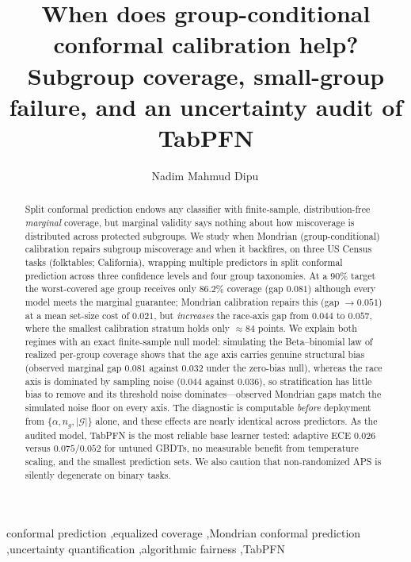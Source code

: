 \documentclass[review,12pt]{elsarticle}
\begin{document}
\begin{frontmatter}

\title{When does group-conditional conformal calibration help? Subgroup coverage, small-group failure, and an uncertainty audit of TabPFN}

\author[inst1]{Nadim Mahmud Dipu\,}

\begin{abstract}
Split conformal prediction endows any classifier with finite-sample, distribution-free \emph{marginal} coverage, but marginal validity says nothing about how miscoverage is distributed across protected subgroups. We study when Mondrian (group-conditional) calibration repairs subgroup miscoverage and when it backfires, on three US Census tasks (folktables; California), wrapping multiple predictors in split conformal prediction across three confidence levels and four group taxonomies. At a $90\%$ target the worst-covered age group receives only $86.2\%$ coverage (gap $0.081$) although every model meets the marginal guarantee; Mondrian calibration repairs this (gap $\to 0.051$) at a mean set-size cost of $0.021$, but \emph{increases} the race-axis gap from $0.044$ to $0.057$, where the smallest calibration stratum holds only $\approx\!84$ points. We explain both regimes with an exact finite-sample null model: simulating the Beta--binomial law of realized per-group coverage shows that the age axis carries genuine structural bias (observed marginal gap $0.081$ against $0.032$ under the zero-bias null), whereas the race axis is dominated by sampling noise ($0.044$ against $0.036$), so stratification has little bias to remove and its threshold noise dominates---observed Mondrian gaps match the simulated noise floor on every axis. The diagnostic is computable \emph{before} deployment from $\{\alpha, n_g, |\mathcal{G}|\}$ alone, and these effects are nearly identical across predictors. As the audited model, TabPFN is the most reliable base learner tested: adaptive ECE $0.026$ versus $0.075$/$0.052$ for untuned GBDTs, no measurable benefit from temperature scaling, and the smallest prediction sets. We also caution that non-randomized APS is silently degenerate on binary tasks.
\end{abstract}

\begin{keyword}
conformal prediction \sep equalized coverage \sep Mondrian conformal prediction \sep uncertainty quantification \sep algorithmic fairness \sep TabPFN
\end{keyword}

\end{frontmatter}
\end{document}
